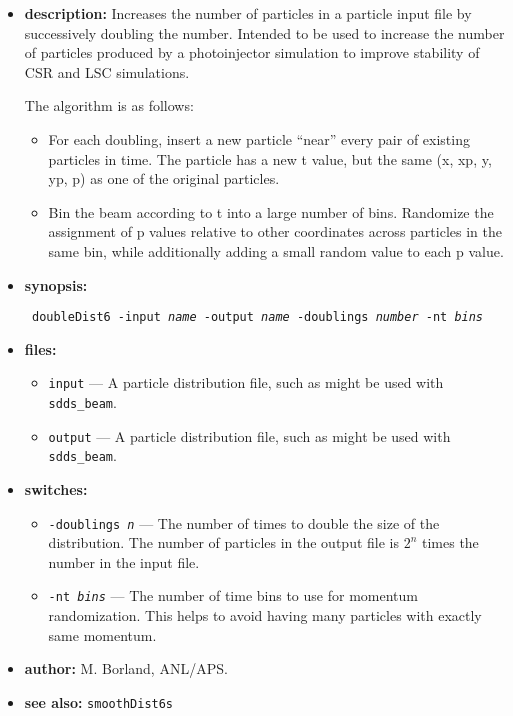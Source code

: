 \documentclass[11pt]{article}
\begin{document}
\begin{itemize}
\item {\bf description:} Increases the number of particles in a particle input file by
 successively doubling the number.  Intended to be used to increase the number of particles
 produced by a photoinjector simulation to improve stability of CSR and LSC simulations.

The algorithm is as follows:
\begin{itemize}
\item For each doubling, insert a new particle ``near'' every pair of existing particles in time.
    The particle has a new t value, but the same (x, xp, y, yp, p) as one of the original particles.
\item Bin the beam according to t into a large number of bins.  Randomize the assignment of p values
    relative to other coordinates across particles in the same bin, while additionally adding a 
    small random value to each p value.
\end{itemize}

\item {\bf synopsis:}
\begin{flushleft}{\tt
doubleDist6 -input {\em name} -output {\em name} -doublings {\em number} -nt {\em bins}
}\end{flushleft}

\item {\bf files:}
\begin{itemize}
\item {\tt input} --- A particle distribution file, such as might be used with \verb|sdds_beam|.
\item {\tt output} --- A particle distribution file, such as might be used with \verb|sdds_beam|.
\end{itemize}

\item {\bf switches:}
\begin{itemize}
\item {\tt -doublings {\em n}} --- The number of times to double the size of the distribution.
 The number of particles in the output file is $2^n$ times the number in the input file.
\item {\tt -nt {\em bins}} --- The number of time bins to use for momentum randomization. This
 helps to avoid having many particles with exactly same momentum.
\end{itemize}

\item {\bf author:} M. Borland, ANL/APS.

\item {\bf see also:} {\tt smoothDist6s}
\end{itemize}
\end{document}
